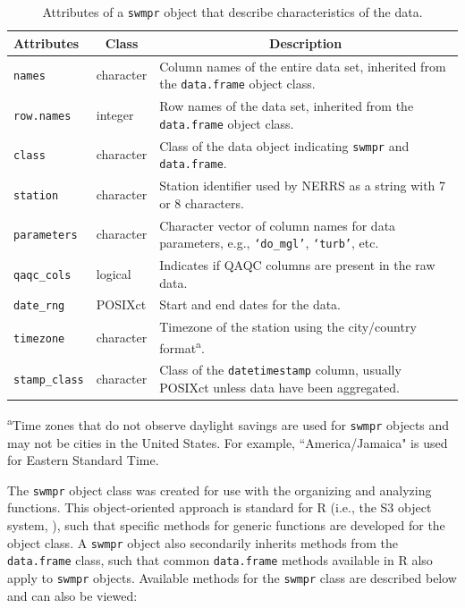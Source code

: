 \documentclass[10pt,letterpaper]{article}\usepackage[]{graphicx}\usepackage[]{color}
\begin{document}
\begin{table}[!tbp]
\caption{Attributes of a \texttt{swmpr} object that describe characteristics of the data.\label{tab:attributes}} 
\begin{center}
\begin{tabular}{lp{0.75in}p{3.25in}}
\hline\hline
\multicolumn{1}{l}{Attributes}&\multicolumn{1}{c}{Class}&\multicolumn{1}{c}{Description}\tabularnewline
\hline
\texttt{names}&character&Column names of the entire data set, inherited from the \texttt{data.frame} object class.\tabularnewline
\texttt{row.names}&integer&Row names of the data set, inherited from the \texttt{data.frame} object class.\tabularnewline
\texttt{class}&character&Class of the data object indicating \texttt{swmpr} and \texttt{data.frame}.\tabularnewline
\texttt{station}&character&Station identifier used by \gls{NERRS} as a string with 7 or 8 characters.\tabularnewline
\texttt{parameters}&character&Character vector of column names for data parameters, e.g., \texttt{`do\_mgl'}, \texttt{`turb'}, etc.\tabularnewline
\texttt{qaqc\_cols}&logical&Indicates if \gls{QAQC} columns are present in the raw data.\tabularnewline
\texttt{date\_rng}&POSIXct&Start and end dates for the data.\tabularnewline
\texttt{timezone}&character&Timezone of the station using the city/country format\textsuperscript{a}.\tabularnewline
\texttt{stamp\_class}&character&Class of the \texttt{datetimestamp} column, usually POSIXct unless data have been aggregated.\tabularnewline
\hline
\end{tabular}\end{center}

\textsuperscript{a}\footnotesize Time zones that do not observe daylight savings are used for \texttt{swmpr} objects and may not be cities in the United States.  For example, ``America/Jamaica" is used for Eastern Standard Time.\end{table}


The \texttt{swmpr} object class was created for use with the organizing and analyzing functions.  This object-oriented approach is standard for R (i.e., the S3 object  system, \cite{Wickham14}), such that specific methods for generic functions are developed for the object class.  A \texttt{swmpr} object also secondarily inherits methods from the \texttt{data.frame} class, such that common \texttt{data.frame} methods available in R also apply to \texttt{swmpr} objects.  Available methods for the \texttt{swmpr} class are described below and can also be viewed:
 
\end{document}
